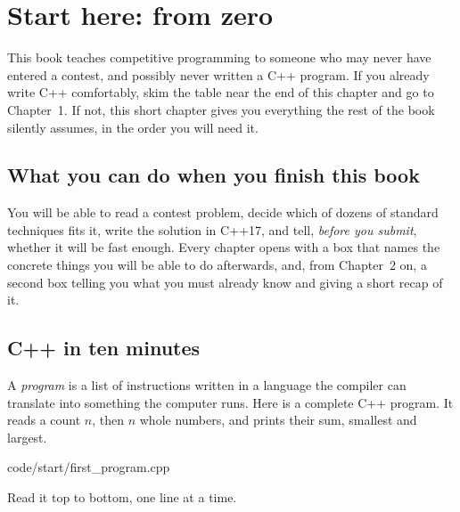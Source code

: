 \chapter*{Start here: from zero}

This book teaches competitive programming to someone who may never have entered
a contest, and possibly never written a C++ program. If you already write C++
comfortably, skim the table near the end of this chapter and go to Chapter~1. If not, this
short chapter gives you everything the rest of the book silently assumes, in the
order you will need it.

\section*{What you can do when you finish this book}\label{sec:start-goal}

You will be able to read a contest problem, decide which of dozens of standard
techniques fits it, write the solution in C++17, and tell, \emph{before you submit},
whether it will be fast enough. Every chapter opens with a box that names the
concrete things you will be able to do afterwards, and, from Chapter~2 on, a
second box telling you what you must already know and giving a short recap of it.

\section*{C++ in ten minutes}\label{sec:start-cpp}

A \emph{program} is a list of instructions written in a language the compiler can
translate into something the computer runs. Here is a complete C++ program. It
reads a count $n$, then $n$ whole numbers, and prints their sum, smallest and
largest.


{code/start/first_program.cpp}

Read it top to bottom, one line at a time.

